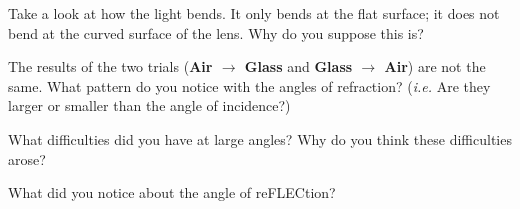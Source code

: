 \documentclass[10pt]{exam}
\begin{document}
\vspace{-1em}
\begin{questions}


  \question
    Take a look at how the light bends.  It only bends at the flat surface; it does not bend at the curved surface of the lens.  Why do you suppose this is? 
    \vs 

  \question
    The results of the two trials ({\bf Air $\rightarrow$ Glass} and {\bf Glass $\rightarrow$ Air}) are not the same.  What pattern do you notice with the angles of refraction? (\emph{i.e.} Are they larger or smaller than the angle of incidence?)
    \vs
  
  \question
    What difficulties did you have at large angles?  Why do you think these difficulties arose?
    \vs 
  
  \question
    What did you notice about the angle of reFLECtion?
    \vs 



\end{questions}

\pagebreak

\vfill\,
\end{document}
